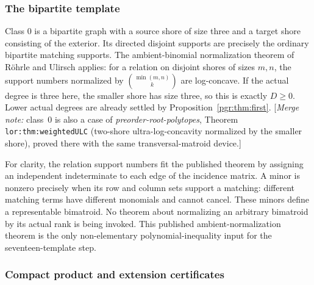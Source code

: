 \documentclass[11pt]{article}
\numberwithin{equation}{section}
\theoremstyle{definition}\newtheorem{definition}[theorem]{Definition}\newtheorem{remark}[theorem]{Remark}
\newcommand{\mnote}[1]{[\textit{Merge note:} #1]}
\newcommand{\prp}{\emph{preorder-root-polytopes}}
\begin{document}
\subsubsection{The bipartite template}

Class 0 is a bipartite graph with a source shore of size three and a target shore consisting of the exterior. Its directed disjoint supports are precisely the ordinary bipartite matching supports. The ambient-binomial normalization theorem of R\"ohrle and Ulirsch \cite[Theorem A and Example 2.4]{RU} applies: for a relation on disjoint shores of sizes $m,n$, the support numbers normalized by $\binom{\min(m,n)}k$ are log-concave. If the actual degree is three here, the smaller shore has size three, so this is exactly $D\ge0$. Lower actual degrees are already settled by Proposition~\ref{pgr:thm:first}. \mnote{class~0 is also a case of \prp, Theorem
\texttt{lor:thm:weightedULC} (two-shore ultra-log-concavity normalized by
the smaller shore), proved there with the same transversal-matroid
device.}

For clarity, the relation support numbers fit the published theorem by assigning an independent indeterminate to each edge of the incidence matrix. A minor is nonzero precisely when its row and column sets support a matching: different matching terms have different monomials and cannot cancel. These minors define a representable bimatroid. No theorem about normalizing an arbitrary bimatroid by its actual rank is being invoked. This published ambient-normalization theorem is the only non-elementary polynomial-inequality input for the seventeen-template step.

\subsubsection{Compact product and extension certificates}
\end{document}

